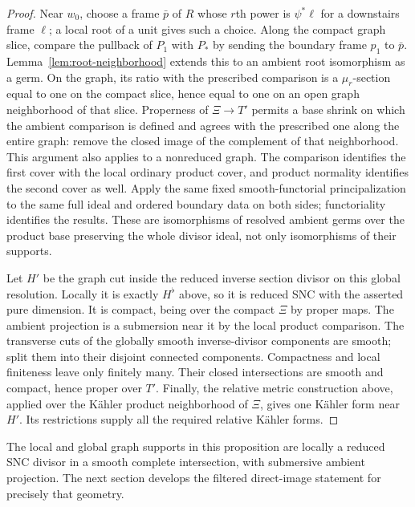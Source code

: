 \begin{proof}
Near \(w_0\), choose a frame \(\bar p\) of \(R\) whose \(r\)th power
is \(\psi^*\ell\) for a downstairs frame \(\ell\); a local root of a
unit gives such a choice.  Along the compact graph slice, compare the
pullback of \(P_1\) with \(P_*\) by sending the boundary frame \(p_1\)
to \(\bar p\).  Lemma~\ref{lem:root-neighborhood} extends this to an
ambient root isomorphism as a germ.  On the graph, its ratio with the
prescribed comparison is a \(\mu_r\)-section equal to one on the compact
slice, hence equal to one on an open graph neighborhood of that slice.
Properness of \(\Xi\to T'\) permits a base shrink on which the ambient
comparison is defined and agrees with the prescribed one along the entire
graph: remove the closed image of the complement of that neighborhood.
This argument also applies to a nonreduced graph.  The comparison identifies
the first cover with the local ordinary product cover, and product
normality identifies the second cover as well.  Apply the same fixed
smooth-functorial principalization to the same full ideal and ordered
boundary data on both sides; functoriality identifies the results.  These are isomorphisms of resolved
ambient germs over the product base preserving the whole divisor ideal,
not only isomorphisms of their supports.

Let \(H'\) be the graph cut inside the reduced inverse section divisor
on this global resolution.  Locally it is exactly \(H^\flat\) above,
so it is reduced SNC with the asserted pure dimension.  It is compact,
being over the compact \(\Xi\) by proper maps.  The ambient projection
is a submersion near it by the local product comparison.  The transverse
cuts of the globally smooth inverse-divisor components are smooth; split
them into their disjoint connected components.  Compactness and local
finiteness leave only finitely many.  Their closed intersections are
smooth and compact, hence proper over \(T'\).  Finally, the relative
metric construction above, applied over the K\"ahler product neighborhood
of \(\Xi\), gives one K\"ahler form near \(H'\).  Its restrictions supply
all the required relative K\"ahler forms.
\end{proof}

The local and global graph supports in this proposition are locally a
reduced SNC divisor in a smooth complete intersection, with submersive
ambient projection.  The next section develops the filtered direct-image
statement for precisely that geometry.
